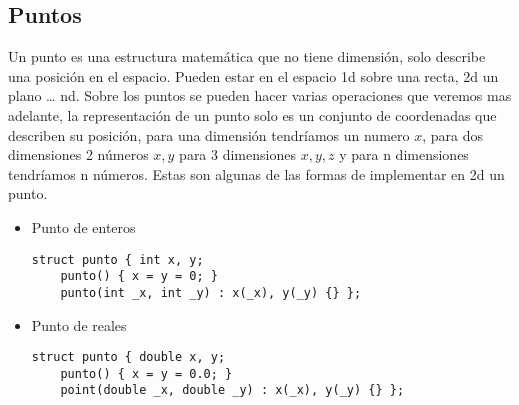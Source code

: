 \subsection{Puntos}
Un punto es una estructura matemática que no tiene dimensión, solo describe  una posición en el espacio. Pueden estar en el espacio
1d sobre una recta, 2d un plano … nd.
Sobre los puntos se pueden hacer varias operaciones que veremos mas adelante, la representación de un punto solo es un conjunto de
coordenadas que describen su posición, para una dimensión tendríamos un numero $x$, para dos dimensiones 2 números $x,y$
para 3 dimensiones $x,y,z$ y para n dimensiones tendríamos n números.
Estas son algunas de las formas de implementar en 2d un punto.
\begin{itemize}
\item Punto de enteros
\\
	\begin{lstlisting}[style=C]
	struct punto { int x, y;
	punto() { x = y = 0; }
	punto(int _x, int _y) : x(_x), y(_y) {} };
	\end{lstlisting}
	\item Punto de reales
	\\
	\begin{lstlisting}[style=C]
	struct punto { double x, y;
	punto() { x = y = 0.0; }
	point(double _x, double _y) : x(_x), y(_y) {} };
	\end{lstlisting}
\end{itemize}
